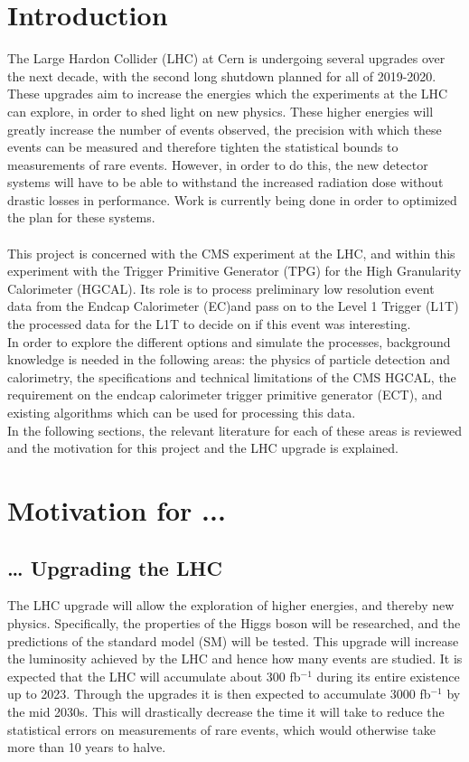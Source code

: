 \documentclass[12 pt]{article}
\begin{document}
	\section{Introduction}
		The Large Hardon Collider (LHC) at Cern is undergoing several upgrades over the next decade, with the second long shutdown planned for all of 2019-2020. These upgrades aim to increase the energies which the experiments at the LHC can explore, in order to shed light on new physics. These higher energies will greatly increase the number of events observed, the precision with which these events can be measured and therefore tighten the statistical bounds to measurements of rare events. However, in order to do this, the new detector systems will have to be able to withstand the increased radiation dose without drastic losses in performance. Work is currently being done in order to optimized the plan for these systems. \\ \\
		This project is concerned with the CMS experiment at the LHC, and within this experiment with the Trigger Primitive Generator (TPG) for the High Granularity Calorimeter (HGCAL). Its role is to process preliminary low resolution event data from the Endcap Calorimeter (EC)and pass on to the Level 1 Trigger (L1T) the processed data for the L1T to decide on if this event was interesting. \\
		In order to explore the different options and simulate the processes, background knowledge is needed in the following areas: the physics of particle detection and calorimetry, the specifications and technical limitations of the CMS HGCAL, the requirement on the endcap calorimeter trigger primitive generator (ECT), and existing algorithms which can be used for processing this data. \\ 
		In the following sections, the relevant literature for each of these areas is reviewed and the motivation for this project and the LHC upgrade is explained.
	\section{Motivation for ...}

		\subsection{… Upgrading the LHC}

			The LHC upgrade will allow the exploration of higher energies, and thereby new physics. Specifically, the properties of the Higgs boson will be researched, and the predictions of the standard model (SM) will be tested. This upgrade will increase the luminosity achieved by the LHC and hence how many events are studied. It is expected that the LHC will accumulate about 300 fb$^{-1}$ during its entire existence up to 2023. Through the upgrades it is then expected to accumulate 3000 fb$^{-1}$ by the mid 2030s. This will drastically decrease the time it will take to reduce the statistical errors on measurements of rare events, which would otherwise take more than 10 years to halve\cite{mot}. \\ \\
\end{document}
